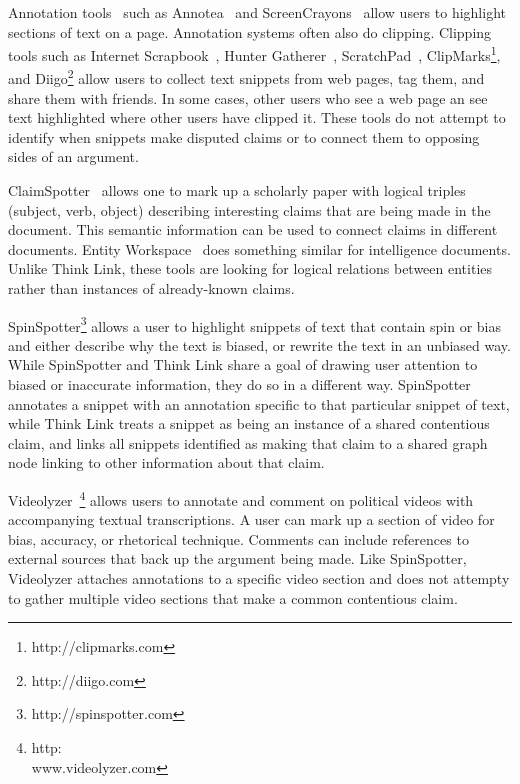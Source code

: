 \documentclass{chi2009}
\newcommand{\todo}[1]{}
\begin{document}
Annotation tools~\cite{Marshall1998} such as Annotea~\cite{Koivunen2001} and ScreenCrayons~\cite{Olsen2004} allow users to highlight sections of text on a page. Annotation systems often also do clipping. Clipping tools such as Internet Scrapbook~\cite{Sugiura1998}, Hunter Gatherer~\cite{Schraefel2002}, ScratchPad~\cite{Gotz2007}, ClipMarks\footnote{http://clipmarks.com}, and Diigo\footnote{http://diigo.com} allow users to collect text snippets from web pages, tag them, and share them with friends. In some cases, other users who see a web page an see text highlighted where other users have clipped it. These tools do not attempt to identify when snippets make disputed claims or to connect them to opposing sides of an argument.

ClaimSpotter~\cite{Sereno2005,Sereno2004} allows one to mark up a scholarly paper with logical triples (subject, verb, object) describing interesting claims that are being made in the document. This semantic information can be used to connect claims in different documents. Entity Workspace~\cite{Bier2006} does something similar for intelligence documents. Unlike Think Link, these tools are looking for logical relations between entities rather than instances of already-known claims.

SpinSpotter\footnote{http://spinspotter.com} allows a user to highlight snippets of text that contain spin or bias and either describe why the text is biased, or rewrite the text in an unbiased way. While SpinSpotter and Think Link share a goal of drawing user attention to biased or inaccurate information, they do so in a different way. SpinSpotter annotates a snippet with an annotation specific to that particular snippet of text, while Think Link treats a snippet as being an instance of a shared contentious claim, and links all snippets identified as making that claim to a shared graph node linking to other information about that claim.

Videolyzer~\cite{Diakopoulos2008}\footnote{http:\\www.videolyzer.com} allows users to annotate and comment on political videos with accompanying textual transcriptions. A user can mark up a section of video for bias, accuracy, or rhetorical technique. Comments can include references to external sources that back up the argument being made. Like SpinSpotter, Videolyzer attaches annotations to a specific video section and does not attempty to gather multiple video sections that make a common contentious claim.

\todo{Ask Nicholas if he would like to read the paper}
\end{document}
